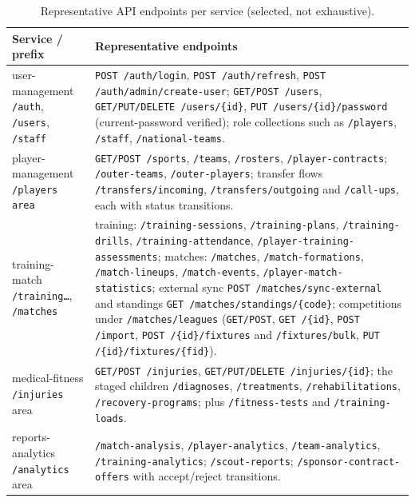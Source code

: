 \begin{table}[htbp]
\centering
\caption{Representative API endpoints per service (selected, not exhaustive).}
\label{tab:api}
\renewcommand{\arraystretch}{1.25}
\begin{tabular}{|p{}|p{}|}
\hline
\textbf{Service / prefix} & \textbf{Representative endpoints} \\
\hline
user-management \newline \texttt{/auth}, \texttt{/users}, \texttt{/staff} &
\texttt{POST /auth/login}, \texttt{POST /auth/refresh}, \texttt{POST /auth/admin/create-user}; \texttt{GET/POST /users}, \texttt{GET/PUT/DELETE /users/\{id\}}, \texttt{PUT /users/\{id\}/password} (current-password verified); role collections such as \texttt{/players}, \texttt{/staff}, \texttt{/national-teams}. \\
\hline
player-management \newline \texttt{/players area} &
\texttt{GET/POST /sports}, \texttt{/teams}, \texttt{/rosters}, \texttt{/player-contracts}; \texttt{/outer-teams}, \texttt{/outer-players}; transfer flows \texttt{/transfers/incoming}, \texttt{/transfers/outgoing} and \texttt{/call-ups}, each with status transitions. \\
\hline
training-match \newline \texttt{/training\dots}, \texttt{/matches} &
training: \texttt{/training-sessions}, \texttt{/training-plans}, \texttt{/training-drills}, \texttt{/training-attendance}, \texttt{/player-training-assessments}; matches: \texttt{/matches}, \texttt{/match-formations}, \texttt{/match-lineups}, \texttt{/match-events}, \texttt{/player-match-statistics}; external sync \texttt{POST /matches/sync-external} and standings \texttt{GET /matches/standings/\{code\}}; competitions under \texttt{/matches/leagues} (\texttt{GET/POST}, \texttt{GET /\{id\}}, \texttt{POST /import}, \texttt{POST /\{id\}/fixtures} and \texttt{/fixtures/bulk}, \texttt{PUT /\{id\}/fixtures/\{fid\}}). \\
\hline
medical-fitness \newline \texttt{/injuries} area &
\texttt{GET/POST /injuries}, \texttt{GET/PUT/DELETE /injuries/\{id\}}; the staged children \texttt{/diagnoses}, \texttt{/treatments}, \texttt{/rehabilitations}, \texttt{/recovery-programs}; plus \texttt{/fitness-tests} and \texttt{/training-loads}. \\
\hline
reports-analytics \newline \texttt{/analytics} area &
\texttt{/match-analysis}, \texttt{/player-analytics}, \texttt{/team-analytics}, \texttt{/training-analytics}; \texttt{/scout-reports}; \texttt{/sponsor-contract-offers} with accept/reject transitions. \\

\end{tabular}
\end{table}
